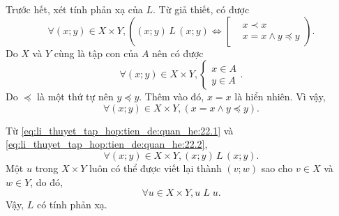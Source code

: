 \resetSubexercise Trước hết, xét tính phản xạ của $L$. Từ giả thiết, có được
\begin{equation}
   \forall (x; y) \in X \times Y, \left((x; y)\,L\,(x; y) \iff \left[\begin{aligned}
      &x \prec x \\
      &x = x \land y \preccurlyeq y
   \end{aligned}\right.\right).
   \label{eq:li_thuyet_tap_hop:tien_de:quan_he:22.1}
\end{equation}
Do $X$ và $Y$ cùng là tập con của $A$ nên có được
\begin{equation*}
   \forall (x; y) \in X \times Y, \begin{cases}
      x \in A \\
      y \in A
   \end{cases}.
\end{equation*}
Do $\preccurlyeq$ là một thứ tự nên $y \preccurlyeq y$. Thêm vào đó, $x = x$ là hiển nhiên. Vì vậy, 
\begin{equation}
   \forall (x; y) \in X \times Y, (x = x \land y \preccurlyeq y).
   \label{eq:li_thuyet_tap_hop:tien_de:quan_he:22.2}
\end{equation}

Từ \eqref{eq:li_thuyet_tap_hop:tien_de:quan_he:22.1} và \eqref{eq:li_thuyet_tap_hop:tien_de:quan_he:22.2}, 
$$\forall (x; y) \in X \times Y, (x; y)\,L\,(x; y).$$
Một $u$ trong $X \times Y$ luôn có thể được viết lại thành $(v; w)$ sao cho $v \in X$ và $w \in Y$, do đó,
$$\forall u \in X \times Y, u\;L\;u.$$
Vậy, $L$ có tính phản xạ.


